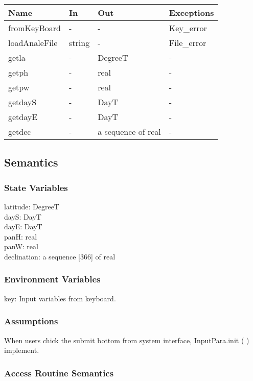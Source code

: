 \documentclass[12pt, titlepage]{article}
\begin{document}
\begin{center}
\begin{tabular}{p{4cm} p{2cm} p{4cm} p{2cm}}
\hline
\textbf{Name} & \textbf{In} & \textbf{Out} & \textbf{Exceptions} \\
\hline 
fromKeyBoard & - & - & Key\_error \\
loadAnaleFile & string & - & File\_error \\
getla & - & DegreeT & - \\
getph & - & real & - \\
getpw & - & real & - \\
getdayS & - & DayT & - \\
getdayE & - & DayT & - \\
getdec & - & a sequence of real & - \\


\hline
\end{tabular}
\end{center}


\subsection{Semantics}

\subsubsection{State Variables}
latitude: DegreeT\\
dayS: DayT \\
dayE: DayT\\
panH: real\\
panW: real\\
declination: a sequence [366] of real


\subsubsection{Environment Variables}
key: Input variables from keyboard.

\subsubsection{Assumptions}
When users chick the submit bottom from system interface, InputPara.init ( ) implement.

\subsubsection{ Access Routine Semantics}
\end{document}
